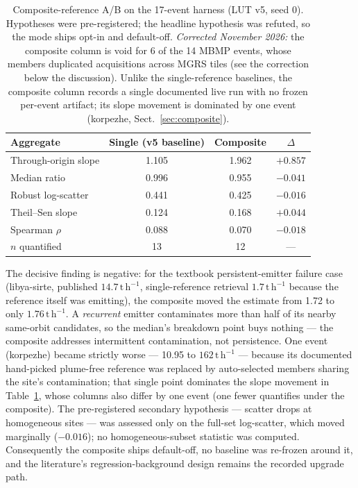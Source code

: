 \documentclass[11pt]{article}
\newcommand{\perh}{\ensuremath{\,\mathrm{t\,h^{-1}}}}
\begin{document}
\begin{table}[tb]
\centering\small
\caption{Composite-reference A/B on the 17-event harness (LUT v5, seed 0).
Hypotheses were pre-registered; the headline hypothesis was refuted, so
the mode ships opt-in and default-off. \emph{Corrected November 2026:} the
composite column is void for 6 of the 14 MBMP events, whose members
duplicated acquisitions across MGRS tiles (see the correction below the
discussion). Unlike the single-reference
baselines, the composite column records a single documented live run with
no frozen per-event artifact; its slope movement is dominated by one
event (korpezhe, Sect.~\ref{sec:composite}).}
\label{tab:composite}
\begin{tabular}{@{}lccc@{}}
\toprule
Aggregate & Single (v5 baseline) & Composite & $\Delta$ \\
\midrule
Through-origin slope & 1.105 & 1.962 & $+0.857$ \\
Median ratio         & 0.996 & 0.955 & $-0.041$ \\
Robust log-scatter   & 0.441 & 0.425 & $-0.016$ \\
Theil--Sen slope     & 0.124 & 0.168 & $+0.044$ \\
Spearman $\rho$      & 0.088 & 0.070 & $-0.018$ \\
$n$ quantified       & 13    & 12    & --- \\
\bottomrule
\end{tabular}
\end{table}

The decisive finding is negative: for the textbook persistent-emitter
failure case (libya-sirte, published $14.7\perh$, single-reference
retrieval $1.7\perh$ because the reference itself was emitting), the
composite moved the estimate from 1.72 to only $1.76\perh$. A
\emph{recurrent} emitter contaminates more than half of its nearby
same-orbit candidates, so the median's breakdown point buys nothing ---
the composite addresses intermittent contamination, not persistence.
One event (korpezhe) became strictly worse --- 10.95 to $162\perh$ ---
because its documented hand-picked plume-free reference was replaced by
auto-selected members sharing the site's contamination; that single point
dominates the slope movement in Table~\ref{tab:composite}, whose columns
also differ by one event (one fewer quantifies under the composite). The
pre-registered secondary hypothesis --- scatter drops at homogeneous
sites --- was assessed only on the full-set log-scatter, which moved
marginally ($-0.016$); no homogeneous-subset statistic was computed.
Consequently the composite ships default-off, no baseline was re-frozen
around it, and the literature's regression-background design remains the
recorded upgrade path.
\end{document}
